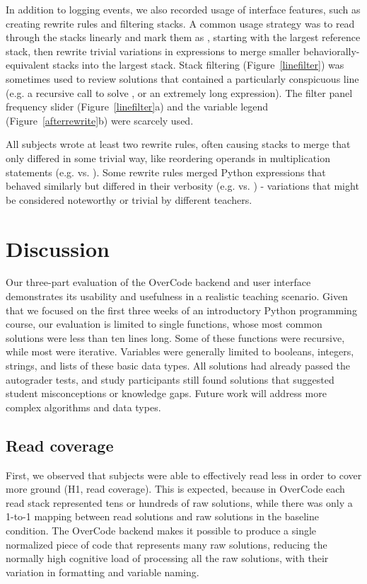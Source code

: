 In addition to logging  events, we also recorded usage of interface features, such as creating rewrite rules and filtering stacks. A common usage strategy was to read through the stacks linearly and mark them as , starting with the largest reference stack, then rewrite trivial variations in expressions to merge smaller behaviorally-equivalent stacks into the largest stack. Stack filtering (Figure~\ref{linefilter}) was sometimes used to review solutions that contained a particularly conspicuous line (e.g. a recursive call to solve , or an extremely long expression). The filter panel frequency slider (Figure~\ref{linefilter}a) and the variable legend (Figure~\ref{afterrewrite}b) were scarcely used.

All subjects wrote at least two rewrite rules, often causing stacks to merge that only differed in some trivial way, like reordering operands in multiplication statements (e.g.  vs. ). Some rewrite rules merged Python expressions that behaved similarly but differed in their verbosity (e.g.  vs. ) - variations that might be considered noteworthy or trivial by different teachers.
\section{Discussion}

Our three-part evaluation of the OverCode backend and user interface demonstrates its usability and usefulness in a realistic teaching scenario. Given that we focused on the first three weeks of an introductory Python programming course, our evaluation is limited to single functions, whose most common solutions were less than ten lines long. Some of these functions were recursive, while most were iterative. Variables were generally limited to booleans, integers, strings, and lists of these basic data types. All solutions had already passed the autograder tests, and study participants still found solutions that suggested student misconceptions or knowledge gaps. Future work will address more complex algorithms and data types.

\subsection{Read coverage}
First, we observed that subjects were able to effectively read less in order to cover more ground (H1, read coverage). This is expected, because in OverCode each read stack represented tens or hundreds of raw solutions, while there was only a 1-to-1 mapping between read solutions and raw solutions in the baseline condition. The OverCode backend makes it possible to produce a single normalized piece of code that represents many raw solutions, reducing the normally high cognitive load of processing all the raw solutions, with their variation in formatting and variable naming.

